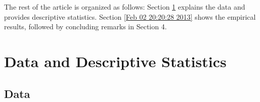 \documentclass[fleqn,11pt]{article}
\begin{document}




The rest of the article is organized as follows: Section \ref{sec:data} explains the data and provides descriptive statistics.
Section \ref{Feb 02 20:20:28 2013} shows
the empirical results, followed by concluding remarks in Section 4.

\section{Data and Descriptive Statistics}

\label{sec:data} 
\subsection{Data}

\end{document}
